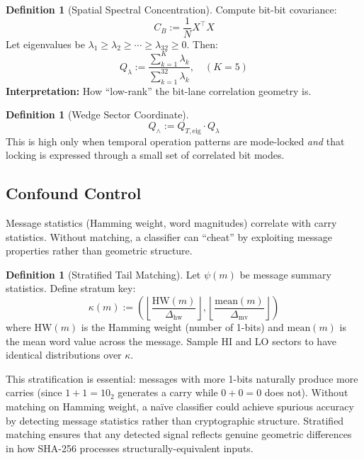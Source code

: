\documentclass[11pt,a4paper]{article}
\theoremstyle{plain}
\theoremstyle{definition}
\newtheorem{definition}[theorem]{Definition}
\theoremstyle{remark}
\newcommand{\Qwedge}{Q_{\wedge}}
\newcommand{\Qlambda}{Q_{\lambda}}
\newcommand{\Qteig}{Q_{T,\mathrm{eig}}}
\begin{document}
\begin{definition}[Spatial Spectral Concentration]
Compute bit-bit covariance:
\begin{equation}
    C_B := \frac{1}{N} X^\top X
\end{equation}
Let eigenvalues be $\lambda_1 \geq \lambda_2 \geq \cdots \geq \lambda_{32} \geq 0$. Then:
\begin{equation}
    \Qlambda := \frac{\sum_{k=1}^{K} \lambda_k}{\sum_{k=1}^{32} \lambda_k}, \quad (K = 5)
\end{equation}
\textbf{Interpretation:} How ``low-rank'' the bit-lane correlation geometry is.
\end{definition}

\begin{definition}[Wedge Sector Coordinate]
\begin{equation}
    \Qwedge := \Qteig \cdot \Qlambda
\end{equation}
This is high only when temporal operation patterns are mode-locked \emph{and} that locking is expressed through a small set of correlated bit modes.
\end{definition}

\subsection{Confound Control}

Message statistics (Hamming weight, word magnitudes) correlate with carry statistics. Without matching, a classifier can ``cheat'' by exploiting message properties rather than geometric structure.

\begin{definition}[Stratified Tail Matching]
Let $\psi(m)$ be message summary statistics. Define stratum key:
\begin{equation}
    \kappa(m) := \left( \left\lfloor \frac{\mathrm{HW}(m)}{\Delta_{\mathrm{hw}}} \right\rfloor, \left\lfloor \frac{\mathrm{mean}(m)}{\Delta_{\mathrm{mv}}} \right\rfloor \right)
\end{equation}
where $\mathrm{HW}(m)$ is the Hamming weight (number of 1-bits) and $\mathrm{mean}(m)$ is the mean word value across the message. Sample HI and LO sectors to have identical distributions over $\kappa$.
\end{definition}

This stratification is essential: messages with more 1-bits naturally produce more carries (since $1+1=10_2$ generates a carry while $0+0=0$ does not). Without matching on Hamming weight, a na\"ive classifier could achieve spurious accuracy by detecting message statistics rather than cryptographic structure. Stratified matching ensures that any detected signal reflects genuine geometric differences in how SHA-256 processes structurally-equivalent inputs.
\end{document}

